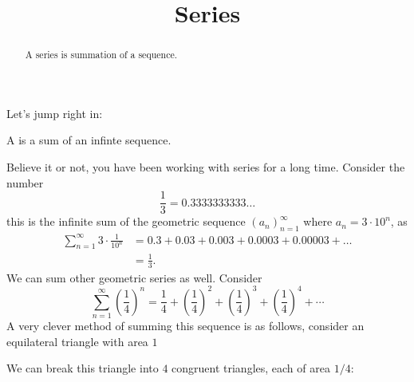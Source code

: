 \documentclass{ximera}
\title[Dig-In:]{Series}
\begin{document}
\begin{abstract}
A series is summation of a sequence.
\end{abstract}
\maketitle


Let's jump right in:


\begin{definition}
  A  is a sum of an infinte sequence.
\end{definition}

Believe it or not, you have been working with series for a long
time. Consider the number
\[
\frac{1}{3} = 0.3333333333\dots
\]
this is the infinite sum of the geometric sequence
$(a_n)_{n=1}^\infty$ where $a_n = 3\cdot 10^{n}$, as
\begin{align*}
  \sum_{n=1}^\infty 3\cdot \frac{1}{10^{n}} &= 0.3 + 0.03+0.003+ 0.0003+ 0.00003+ \dots\\
  &=\frac{1}{3}.
\end{align*}
We can sum other geometric series as well. Consider
\[
\sum_{n=1}^\infty \left(\frac{1}{4}\right)^n =
\frac{1}{4} + \left(\frac{1}{4}\right)^2 + \left(\frac{1}{4}\right)^3 + \left(\frac{1}{4}\right)^4 + \cdots 
\]
A very clever method of summing this sequence is as follows, consider
an equilateral triangle with area $1$
\begin{image}
\end{image}
We can break this triangle into $4$ congruent triangles, each of area
$1/4$:
\begin{image}
\end{image}

\begin{image}
\end{image}
\end{document}
